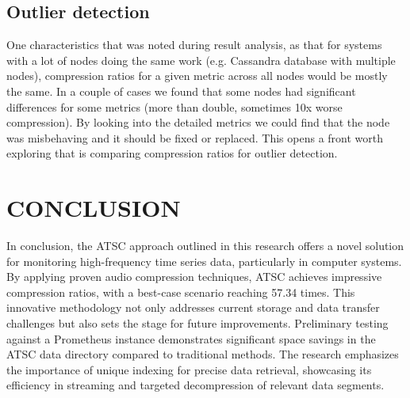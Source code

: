 \documentclass[conference]{IEEEtran}
\begin{document}
\subsection{Outlier detection}

One characteristics that was noted during result analysis, as that for systems with a lot of nodes doing the same work (e.g. Cassandra database with multiple nodes), compression ratios for a given metric across all nodes would be mostly the same.
In a couple of cases we found that some nodes had significant differences for some metrics (more than double, sometimes 10x worse compression). By looking into the detailed metrics we could find that the node was misbehaving and it should be fixed 
or replaced. This opens a front worth exploring that is comparing compression ratios for outlier detection.



\section{CONCLUSION}

In conclusion, the ATSC approach outlined in this research offers a novel solution for monitoring high-frequency time series data, particularly in computer systems. By applying proven audio compression techniques, ATSC achieves impressive compression ratios, with a best-case scenario reaching 57.34 times. This innovative methodology not only addresses current storage and data transfer challenges but also sets the stage for future improvements.
\vspace{5pt}
Preliminary testing against a Prometheus instance demonstrates significant space savings in the ATSC data directory compared to traditional methods. The research emphasizes the importance of unique indexing for precise data retrieval, showcasing its efficiency in streaming and targeted decompression of relevant data segments.
\end{document}
